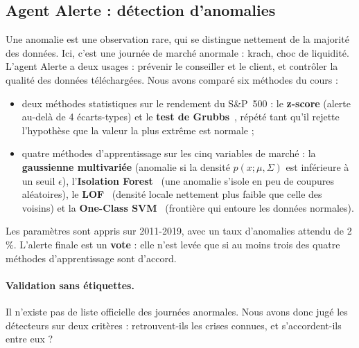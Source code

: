\subsection{Agent Alerte : détection d'anomalies}

Une anomalie est une observation rare, qui se distingue nettement de la majorité des données. Ici, c'est une journée de marché anormale : krach, choc de liquidité. L'agent Alerte a deux usages : prévenir le conseiller et le client, et contrôler la qualité des données téléchargées. Nous avons comparé six méthodes du cours :
\begin{itemize}
  \item deux méthodes statistiques sur le rendement du S\&P~500 : le \textbf{z-score} (alerte au-delà de 4 écarts-types) et le \textbf{test de Grubbs}~\cite{grubbs1969}, répété tant qu'il rejette l'hypothèse que la valeur la plus extrême est normale ;
  \item quatre méthodes d'apprentissage sur les cinq variables de marché : la \textbf{gaussienne multivariée} (anomalie si la densité $p(x;\mu,\Sigma)$ est inférieure à un seuil $\epsilon$), l'\textbf{Isolation Forest}~\cite{liu2008} (une anomalie s'isole en peu de coupures aléatoires), le \textbf{LOF}~\cite{breunig2000} (densité locale nettement plus faible que celle des voisins) et la \textbf{One-Class SVM}~\cite{scholkopf2001} (frontière qui entoure les données normales).
\end{itemize}
Les paramètres sont appris sur 2011-2019, avec un taux d'anomalies attendu de 2 \%. L'alerte finale est un \textbf{vote} : elle n'est levée que si au moins trois des quatre méthodes d'apprentissage sont d'accord.

\paragraph{Validation sans étiquettes.} Il n'existe pas de liste officielle des journées anormales. Nous avons donc jugé les détecteurs sur deux critères : retrouvent-ils les crises connues, et s'accordent-ils entre eux ?

